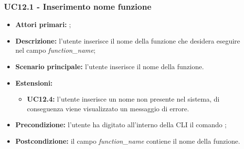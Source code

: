 \subsubsection{UC12.1 - Inserimento nome funzione}
\begin{itemize}
	\item \textbf{Attori primari:} \ua{};
	\item \textbf{Descrizione:} l’utente inserisce il nome della funzione che desidera eseguire nel campo \textit{function\_name};
	\item \textbf{Scenario principale:} l'utente inserisce il nome della funzione. 
	\item \textbf{Estensioni:} 
	\begin{itemize}
		\item \textbf{UC12.4:} l’utente inserisce un nome non presente nel sistema, di conseguenza viene visualizzato un messaggio di errore.
	\end{itemize}
	\item \textbf{Precondizione:} l’utente ha digitato all’interno della CLI il comando \run{};
	\item \textbf{Postcondizione:}  il campo \textit{function\_name} contiene il nome della funzione.
\end{itemize}